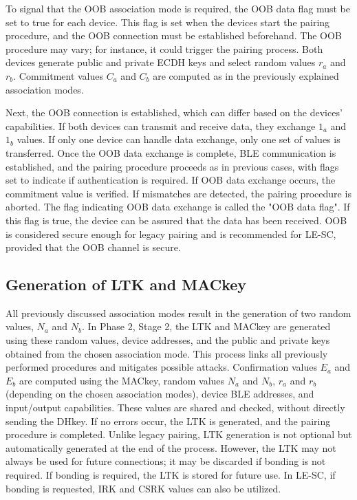 \documentclass{Configuration_Files/PoliMi3i_thesis}
\begin{document}
To signal that the OOB association mode is required, the OOB data flag must be set to true for each device. This flag is set when the devices start the pairing procedure, and the OOB connection must be established beforehand. The OOB procedure may vary; for instance, it could trigger the pairing process. Both devices generate public and private ECDH keys and select random values \( r_a \) and \( r_b \). Commitment values \( C_a \) and \( C_b \) are computed as in the previously explained association modes. 

Next, the OOB connection is established, which can differ based on the devices' capabilities. If both devices can transmit and receive data, they exchange \( 1_a \) and \( 1_b \) values. If only one device can handle data exchange, only one set of values is transferred. Once the OOB data exchange is complete, BLE communication is established, and the pairing procedure proceeds as in previous cases, with flags set to indicate if authentication is required. If OOB data exchange occurs, the commitment value is verified. If mismatches are detected, the pairing procedure is aborted. The flag indicating OOB data exchange is called the "OOB data flag". If this flag is true, the device can be assured that the data has been received. OOB is considered secure enough for legacy pairing and is recommended for LE-SC, provided that the OOB channel is secure.

\subsection{Generation of LTK and MACkey}

All previously discussed association modes result in the generation of two random values, \( N_a \) and \( N_b \). In Phase 2, Stage 2, the LTK and MACkey are generated using these random values, device addresses, and the public and private keys obtained from the chosen association mode. This process links all previously performed procedures and mitigates possible attacks. Confirmation values \( E_a \) and \( E_b \) are computed using the MACkey, random values \( N_a \) and \( N_b \), \( r_a \) and \( r_b \) (depending on the chosen association modes), device BLE addresses, and input/output capabilities. These values are shared and checked, without directly sending the DHkey. If no errors occur, the LTK is generated, and the pairing procedure is completed. Unlike legacy pairing, LTK generation is not optional but automatically generated at the end of the process. However, the LTK may not always be used for future connections; it may be discarded if bonding is not required. If bonding is required, the LTK is stored for future use. In LE-SC, if bonding is requested, IRK and CSRK values can also be utilized.
\end{document}
